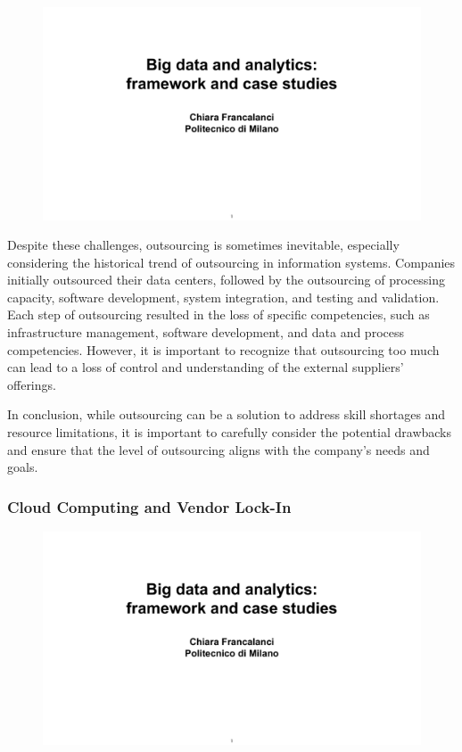 \begin{figure}[!h]
    \centering
    \includegraphics[page=76, trim = 1cm 4cm 1.5cm 5cm, clip, width=\textwidth]{images/06 - BIG_DATA.pdf}
\end{figure}

Despite these challenges, outsourcing is sometimes inevitable,
especially considering the historical trend of outsourcing in
information systems. Companies initially outsourced their data centers,
followed by the outsourcing of processing capacity, software
development, system integration, and testing and validation. Each step
of outsourcing resulted in the loss of specific competencies, such as
infrastructure management, software development, and data and process
competencies. However, it is important to recognize that outsourcing too
much can lead to a loss of control and understanding of the external
suppliers' offerings.

In conclusion, while outsourcing can be a solution to address skill
shortages and resource limitations, it is important to carefully
consider the potential drawbacks and ensure that the level of
outsourcing aligns with the company's needs and goals.

\subsubsection{Cloud Computing and Vendor Lock-In}

\begin{figure}[!h]
    \centering
    \includegraphics[page=83, trim = 1cm 1.5cm 1.5cm 3cm, clip, width=\textwidth]{images/06 - BIG_DATA.pdf}
\end{figure}

